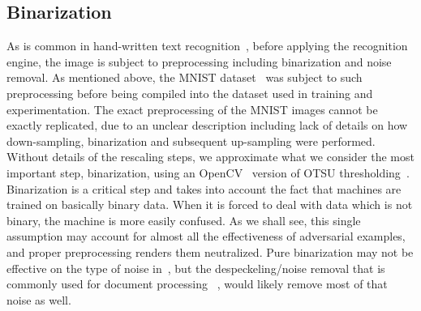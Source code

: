 \documentclass[conference]{IEEEtran}
\begin{document}
\subsection{Binarization}
As is common in hand-written text recognition~\cite{c19},  before applying the recognition engine, the image is subject to preprocessing including binarization and noise removal. As mentioned above, the MNIST dataset~\cite{c9} was subject to such preprocessing before being compiled into the dataset used in training and experimentation.  The exact preprocessing of the MNIST images cannot be exactly replicated, due to an unclear description including lack of details on how down-sampling, binarization and subsequent up-sampling were performed.  Without details of the rescaling steps,  we approximate what we consider the most important step, binarization,  using an OpenCV~\cite{c20} version  of OTSU thresholding~\cite{c21}.  Binarization  is a critical step and takes into account the fact that machines are trained on basically binary data.  When it is forced to deal with data which is not binary, the machine is more easily confused. As we shall see, this single assumption may account for almost all the effectiveness of adversarial examples, and proper preprocessing renders them neutralized. Pure binarization may not be effective on the type of noise in~\cite{c3}, but the despeckeling/noise removal that is commonly used for document processing ~\cite{c19,c22}, would likely remove most of that noise as well.

\end{document}
